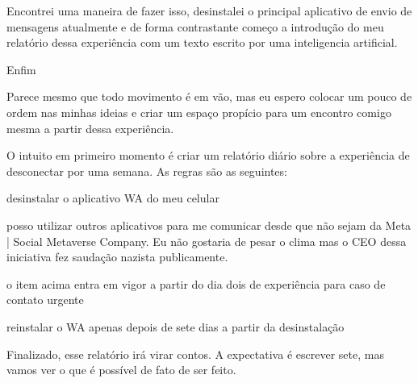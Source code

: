 Encontrei uma maneira de fazer isso, desinstalei o principal aplicativo de envio de mensagens atualmente e de forma contrastante começo a introdução do meu relatório dessa experiência com um texto escrito por uma inteligencia artificial.

Enfim

Parece mesmo que todo movimento é em vão, mas eu espero colocar um pouco de ordem nas minhas ideias e criar um espaço propício para um encontro comigo mesma a partir dessa experiência.


O intuito em primeiro momento é criar um relatório diário sobre a experiência de desconectar por uma semana. As regras são as seguintes:

\item {desinstalar o aplicativo WA do meu celular}
\item {posso utilizar outros aplicativos para me comunicar desde que não sejam da Meta | Social Metaverse Company. Eu não gostaria de pesar o clima mas o CEO dessa iniciativa fez saudação nazista publicamente. }
\item {o item acima entra em vigor a partir do dia dois de experiência para caso de contato urgente}
\item {reinstalar o WA apenas depois de sete dias a partir da desinstalação}

Finalizado, esse relatório irá virar contos. A expectativa é escrever sete, mas vamos ver o que é possível de fato de ser feito.